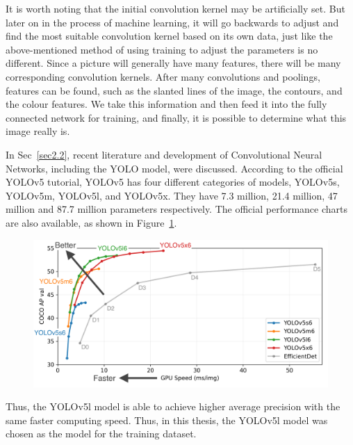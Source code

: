 It is worth noting that the initial convolution kernel may be artificially set. But later on in the process of machine learning, it will go backwards to adjust and find the most suitable convolution kernel based on its own data, just like the above-mentioned method of using training to adjust the parameters is no different. Since a picture will generally have many features, there will be many corresponding convolution kernels. After many convolutions and poolings, features can be found, such as the slanted lines of the image, the contours, and the colour features. We take this information and then feed it into the fully connected network for training, and finally, it is possible to determine what this image really is.

In Sec~\ref{sec2.2}, recent literature and development of Convolutional Neural Networks, including the YOLO model, were discussed. According to the official YOLOv5 tutorial, YOLOv5 has four different categories of models, YOLOv5s, YOLOv5m, YOLOv5l, and YOLOv5x. They have 7.3 million, 21.4 million, 47 million and 87.7 million parameters respectively. The official performance charts are also available, as shown in Figure~\ref{fig:YOLOv5_Performance}.

\begin{figure}[h]
    \centering
    \includegraphics[scale=0.7]{img/YOLOv5_Performance.png}
    \label{fig:YOLOv5_Performance}
\end{figure}

Thus, the YOLOv5l model is able to achieve higher average precision with the same faster computing speed. Thus, in this thesis, the YOLOv5l model was chosen as the model for the training dataset.




